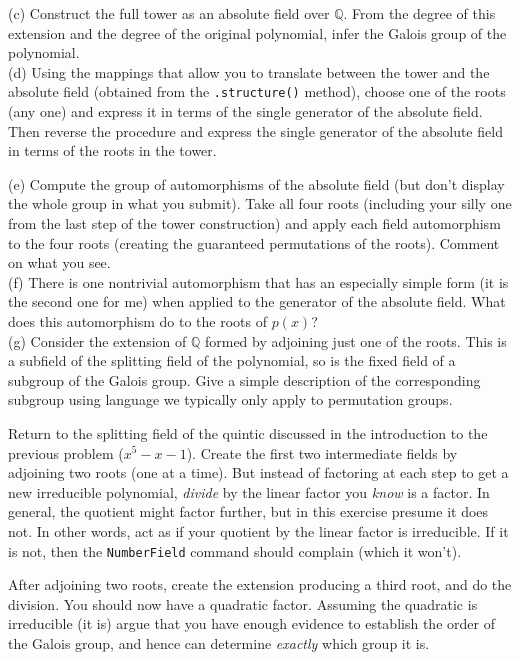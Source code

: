 %
(c) Construct the full tower as an absolute field over ${\mathbb Q}$.  From the degree of this extension and the degree of the original polynomial, infer the Galois group of the polynomial.\\
%
(d) Using the mappings that allow you to translate between the tower and the absolute field (obtained from the \verb?.structure()? method), choose one of the roots (any one) and express it in terms of the single generator of the absolute field.  Then reverse the procedure and express the single generator of the absolute field in terms of the roots in the tower.\par
%
(e) Compute the group of automorphisms of the absolute field (but don't display the whole group in what you submit).  Take all four roots (including your silly one from the last step of the tower construction) and apply each field automorphism to the four roots (creating the guaranteed permutations of the roots).  Comment on what you see.\\
%
(f)  There is one nontrivial automorphism that has an especially simple form (it is the second one for me) when applied to the generator of the absolute field.  What does this automorphism do to the roots of $p(x)$?\\
%
(g)  Consider the extension of ${\mathbb Q}$ formed by adjoining just one of the roots.  This is a subfield of the splitting field of the polynomial, so is the fixed field of a subgroup of the Galois group.  Give a simple description of the corresponding subgroup using language we typically only apply to permutation groups.
\begin{sageverbatim}\end{sageverbatim}
%
%
Return to the splitting field of the quintic discussed in the introduction to the previous problem ($x^5-x-1$).  Create the first two intermediate fields by adjoining two roots (one at a time).  But instead of factoring at each step to get a new irreducible polynomial, \emph{divide} by the linear factor you \emph{know} is a factor.  In general, the quotient might factor further, but in this exercise presume it does not.  In other words, act as if your quotient by the linear factor is irreducible.  If it is not, then the \texttt{NumberField} command should complain (which it won't).\par
%
After adjoining two roots, create the extension producing a third root, and do the division.  You should now have a quadratic factor.  Assuming the quadratic is irreducible (it is) argue that you have enough evidence to establish the order of the Galois group, and hence can determine \emph{exactly} which group it is.\par
